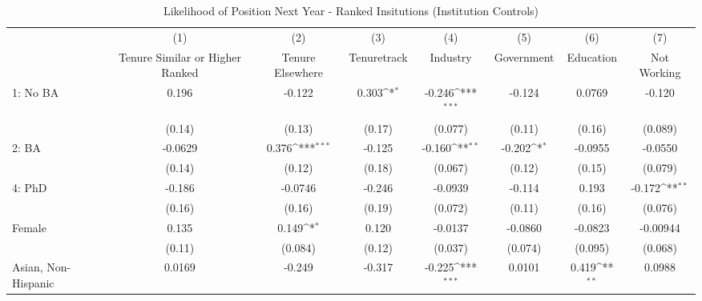 \begin{table}[htbp]\centering
\def\sym#1{\ifmmode^{#1}\else\(^{#1}\)\fi}
\caption{Likelihood of Position Next Year - Ranked Insitutions (Institution Controls)\label{tab2\_tenure}}
\begin{tabular}{l*{7}{c}}
\hline\hline
  &\multicolumn{1}{c}{(1)}&\multicolumn{1}{c}{(2)}&\multicolumn{1}{c}{(3)}&\multicolumn{1}{c}{(4)}&\multicolumn{1}{c}{(5)}&\multicolumn{1}{c}{(6)}&\multicolumn{1}{c}{(7)}\\
  &\multicolumn{1}{c}{Tenure Similar or Higher Ranked}&\multicolumn{1}{c}{Tenure Elsewhere}&\multicolumn{1}{c}{Tenuretrack}&\multicolumn{1}{c}{Industry}&\multicolumn{1}{c}{Government}&\multicolumn{1}{c}{Education}&\multicolumn{1}{c}{Not Working}\\
\hline
1: No BA&       0.196         &      -0.122         &       0.303\sym{*}  &      -0.246\sym{***}&      -0.124         &      0.0769         &      -0.120         \\
  &      (0.14)         &      (0.13)         &      (0.17)         &     (0.077)         &      (0.11)         &      (0.16)         &     (0.089)         \\
[1em]
2: BA&     -0.0629         &       0.376\sym{***}&      -0.125         &      -0.160\sym{**} &      -0.202\sym{*}  &     -0.0955         &     -0.0550         \\
  &      (0.14)         &      (0.12)         &      (0.18)         &     (0.067)         &      (0.12)         &      (0.15)         &     (0.079)         \\
[1em]
4: PhD&      -0.186         &     -0.0746         &      -0.246         &     -0.0939         &      -0.114         &       0.193         &      -0.172\sym{**} \\
  &      (0.16)         &      (0.16)         &      (0.19)         &     (0.072)         &      (0.11)         &      (0.16)         &     (0.076)         \\
[1em]
Female&       0.135         &       0.149\sym{*}  &       0.120         &     -0.0137         &     -0.0860         &     -0.0823         &    -0.00944         \\
  &      (0.11)         &     (0.084)         &      (0.12)         &     (0.037)         &     (0.074)         &     (0.095)         &     (0.068)         \\
[1em]
Asian, Non-Hispanic&      0.0169         &      -0.249         &      -0.317         &      -0.225\sym{***}&      0.0101         &       0.419\sym{**} &      0.0988         \\

\end{tabular}
\end{table}
